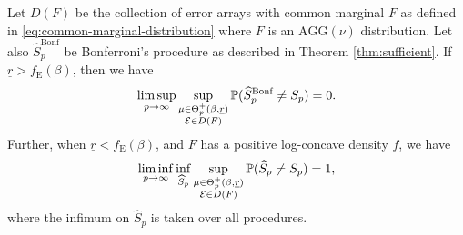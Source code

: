 \begin{corollary}
\label{cor:minimax-over-dependence}
Let $D(F)$ be the collection of error arrays with common marginal $F$ as defined in \eqref{eq:common-marginal-distribution} where $F$ is an $\text{AGG}(\nu)$ distribution.
Let also $\widehat{S}^{\text{Bonf}}_p$ be Bonferroni's procedure as described in Theorem \ref{thm:sufficient}.
If $\underline{r}>f_{\mathrm{E}}(\beta)$, then we have
\begin{equation} \label{eq:minimax-over-dependence-over}
    \limsup_{p\to\infty} \sup_{\substack{\mu\in\Theta_p^+(\beta,\underline{r})\\ {\cal E}\in D(F)}} \P(\widehat{S}^{\text{Bonf}}_p \neq S_p) = 0.
\end{equation}
Further, when $\underline{r}<f_{\mathrm{E}}(\beta)$, and $F$ has a positive log-concave density $f$, we have
\begin{equation} \label{eq:minimax-over-dependence-under}
    \liminf_{p\to\infty} \inf_{\widehat{S}_p} \sup_{\substack{\mu\in\Theta_p^+(\beta,\underline{r})\\ {\cal E}\in D(F)}} \P(\widehat{S}_p \neq S_p) = 
    1,
\end{equation}
where the infimum on $\widehat{S}_p$ is taken over all procedures.
\end{corollary}
